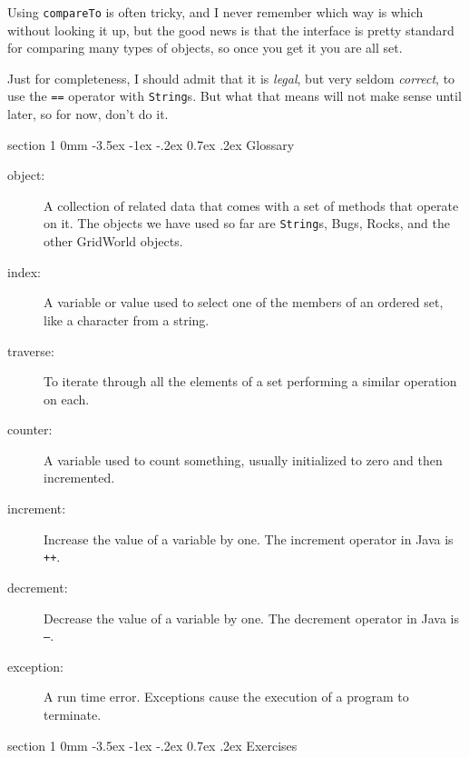 \documentclass{book}
\makeatletter
\renewcommand{\section}{\@startsection 
    {section} {1} {0mm}%
    {-3.5ex \@plus -1ex \@minus -.2ex}%
    {0.7ex \@plus.2ex}%
    {\normalfont\Large\bfseries}}
\makeatother
\begin{document}
Using {\tt compareTo} is often tricky, and I never remember
which way is which without looking it up, but the good news
is that the interface is pretty standard for comparing many
types of objects, so once you get it you are all set.

Just for completeness, I should admit that it is
{\em legal}, but very seldom {\em correct}, to use the {\tt ==}
operator with {\tt String}s.  But what that means will not make
sense until later, so for now, don't do it.


\section{Glossary}

\begin{description}

\item[object:] A collection of related data that comes with a set of
methods that operate on it.  The objects we have used so far are
{\tt String}s, Bugs, Rocks, and the other GridWorld objects.

\item[index:]  A variable or value used to select one of the
members of an ordered set, like a character from a string.

\item[traverse:]  To iterate through all the elements of a set
performing a similar operation on each.

\item[counter:]  A variable used to count something, usually
initialized to zero and then incremented.

\item[increment:]  Increase the value of a variable by one.
The increment operator in Java is {\tt ++}.

\item[decrement:]  Decrease the value of a variable by one.
The decrement operator in Java is {\tt --}.

\item[exception:]  A run time error.  Exceptions cause the execution
of a program to terminate.


\end{description}


\section{Exercises}
\end{document}
